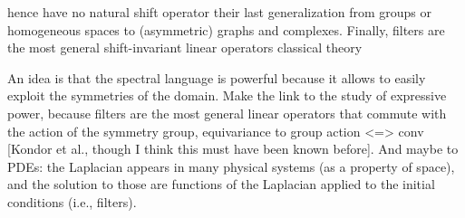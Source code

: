 hence have no natural shift operator
their last generalization from groups or homogeneous spaces to (asymmetric) graphs and complexes.
Finally, filters are the most general shift-invariant linear operators
classical theory


An idea is that the spectral language is powerful because it allows to easily exploit the symmetries of the domain. Make the link to the study of expressive power, because filters are the most general linear operators that commute with the action of the symmetry group, equivariance to group action <=> conv [Kondor et al., though I think this must have been known before]. And maybe to PDEs: the Laplacian appears in many physical systems (as a property of space), and the solution to those are functions of the Laplacian applied to the initial conditions (i.e., filters).

